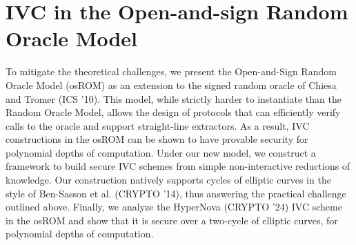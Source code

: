 \documentclass[11pt]{article}
\theoremstyle{definition}
\theoremstyle{remark}
\theoremstyle{plain}
\begin{document}
\section{\cite{cryptoeprint:2025/1663} IVC in the Open-and-sign Random Oracle Model}
To mitigate the theoretical challenges, we present the Open-and-Sign Random Oracle Model (osROM) as an extension to the signed random oracle of Chiesa and Tromer (ICS '10). This model, while strictly harder to instantiate than the Random Oracle Model, allows the design of protocols that can efficiently verify calls to the oracle and support straight-line extractors. As a result, IVC constructions in the osROM can be shown to have provable security for polynomial depths of computation. Under our new model, we construct a framework to build secure IVC schemes from simple non-interactive reductions of knowledge. Our construction natively supports cycles of elliptic curves in the style of Ben-Sasson et al. (CRYPTO '14), thus answering the practical challenge outlined above. Finally, we analyze the HyperNova (CRYPTO '24) IVC scheme in the osROM and show that it is secure over a two-cycle of elliptic curves, for polynomial depths of computation.

%
%
\printbibliography
\end{document}
